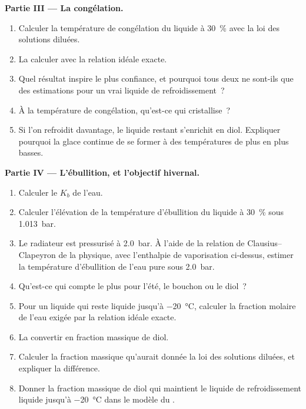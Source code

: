 \begin{problem}
\medskip
\noindent\textbf{Partie III --- La congélation.}
\begin{enumerate}[resume]
  \item Calculer la température de congélation du liquide à \qty{30}{\percent} avec la
        loi des solutions diluées.
  \item La calculer avec la relation idéale exacte.
  \item Quel résultat inspire le plus confiance, et pourquoi tous deux ne sont-ils que des estimations pour un
        vrai liquide de refroidissement~?
  \item À la température de congélation, qu'est-ce qui cristallise~?
  \item Si l'on refroidit davantage, le liquide restant s'enrichit en diol. Expliquer
        pourquoi la glace continue de se former à des températures de plus en plus basses.
\end{enumerate}

\medskip
\noindent\textbf{Partie IV --- L'ébullition, et l'objectif hivernal.}
\begin{enumerate}[resume]
  \item Calculer le $K_b$ de l'eau.
  \item Calculer l'élévation de la température d'ébullition du liquide à \qty{30}{\percent}
        sous \qty{1.013}{bar}.
  \item Le radiateur est pressurisé à \qty{2.0}{bar}. À l'aide de la
        relation de Clausius--Clapeyron de la physique, avec l'enthalpie de
        vaporisation ci-dessus, estimer la température d'ébullition de l'eau pure sous
        \qty{2.0}{bar}.
  \item Qu'est-ce qui compte le plus pour l'été, le bouchon ou le diol~?
  \item Pour un liquide qui reste liquide jusqu'à \qty{-20}{\celsius}, calculer la fraction
        molaire de l'eau exigée par la relation idéale exacte.
  \item La convertir en fraction massique de diol.
  \item Calculer la fraction massique qu'aurait donnée la loi des solutions diluées, et
        expliquer la différence.
  \item Donner la fraction massique de diol qui maintient le liquide de refroidissement liquide jusqu'à
        \qty{-20}{\celsius} dans le modèle du .
\end{enumerate}
\end{problem}
